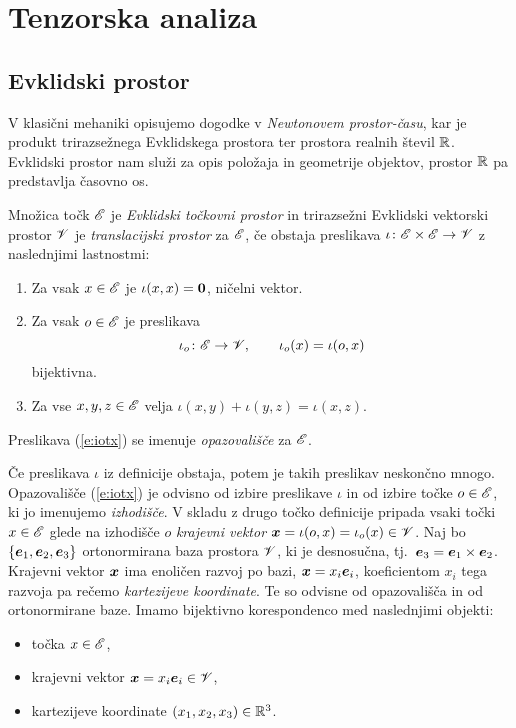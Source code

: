 \section{Tenzorska analiza}


\subsection{Evklidski prostor} \label{s:evklipro}


V klasični mehaniki opisujemo dogodke v \emph{Newtonovem prostor-času}, kar je produkt
trirazsežnega Evklidskega prostora ter prostora realnih števil $\mathbb R$. Evklidski prostor nam služi
za opis položaja in geometrije objektov, prostor $\mathbb R$ pa predstavlja časovno os.

\begin{definicija} \label{d:ep}
	Množica točk $\mathscr E$ je \emph{Evklidski točkovni prostor} in trirazsežni Evklidski vektorski prostor $\mathscr V$ je
	\emph{translacijski prostor} za $\mathscr E$, če obstaja preslikava $\iota\colon\mathscr E\times\mathscr E\to\mathscr V$
	z naslednjimi lastnostmi:
	\begin{enumerate}
		\item Za vsak $x\in\mathscr E$ je $\iota(x,x)=\boldsymbol 0$, ničelni vektor.
		\item Za vsak $o\in\mathscr E$ je preslikava
		\begin{equation} \label{e:iotx}
			\iota_o\colon\mathscr E\to\mathscr V,\qquad\iota_o(x)=\iota(o,x)
		\end{equation}
		bijektivna.
		\item Za vse $x,y,z\in\mathscr E$ velja $\iota(x,y)+\iota(y,z)=\iota(x,z)$.
	\end{enumerate}
	Preslikava (\ref{e:iotx}) se imenuje \emph{opazovališče} za $\mathscr E$.
\end{definicija}

Če preslikava $\iota$ iz definicije obstaja, potem je takih preslikav neskončno mnogo.
Opazovališče (\ref{e:iotx}) je odvisno od izbire preslikave $\iota$ in od izbire točke $o\in\mathscr E$,
ki jo imenujemo \emph{izhodišče}. 
V skladu z drugo točko definicije pripada vsaki točki $x\in\mathscr E$ glede na izhodišče $o$ \emph{krajevni vektor}
$\boldsymbol x=\iota(o,x)=\iota_o(x)\in \mathscr V$. Naj bo $\{\boldsymbol e_1,\boldsymbol e_2,\boldsymbol e_3\}$ ortonormirana baza prostora $\mathscr V$,
ki je desnosučna, tj.~$\boldsymbol e_3=\boldsymbol e_1\times\boldsymbol e_2$. Krajevni vektor $\boldsymbol x$
ima enoličen razvoj po bazi, $\boldsymbol x=x_i\boldsymbol e_i$, koeficientom $x_i$ tega razvoja pa rečemo
\emph{kartezijeve koordinate}. Te so odvisne od opazovališča in od ortonormirane baze.
Imamo bijektivno korespondenco med naslednjimi objekti:
\begin{itemize}
	\item točka $x\in\mathscr E$,
	\item krajevni vektor $\boldsymbol x=x_i\boldsymbol e_i\in \mathscr V$,
	\item kartezijeve koordinate $(x_1,x_2,x_3)\in\mathbb R^3$.
\end{itemize}

